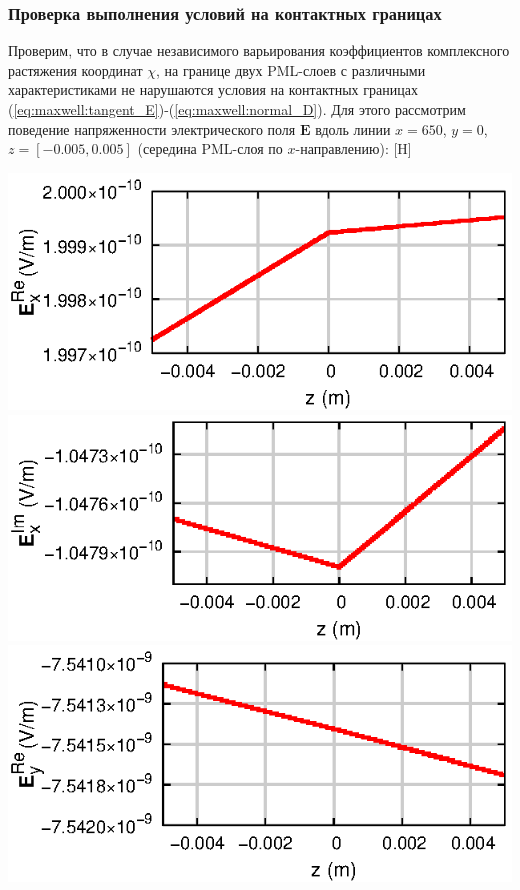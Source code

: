 \documentclass[a4paper,14pt]{article}
\makeatletter
\renewenvironment{figure}[1][\fps@figure]{
  \edef\@tempa{\noexpand\@float{figure}[#1]}
  \@tempa
  \addtocounter{foofigure}{1}
}{
  \end@float
}
\makeatother
\begin{document}
\subsubsection{Проверка выполнения условий на контактных границах}
Проверим, что в случае независимого варьирования коэффициентов комплексного растяжения координат $\chi$, на границе двух PML-слоев с различными характеристиками не нарушаются условия на контактных границах (\ref{eq:maxwell:tangent_E})-(\ref{eq:maxwell:normal_D}). Для этого рассмотрим поведение напряженности электрического поля $\mathbf{E}$ вдоль линии $x = 650$, $y = 0$, $z = [-0.005, 0.005]$ (середина PML-слоя по $x$-направлению):
\begin{figure}[H]
	\centering
	\includegraphics[scale=1]{research-2/650/ExR.eps}
	\includegraphics[scale=1]{research-2/650/ExI.eps}
	\includegraphics[scale=1]{research-2/650/EyR.eps}

\end{figure}
\end{document}
